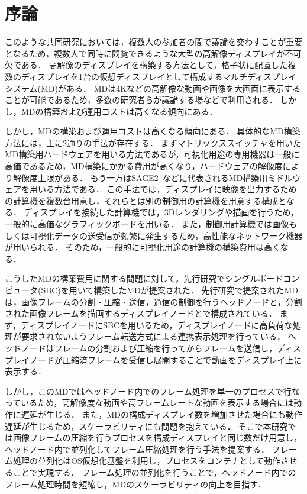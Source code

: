 \chapter{序論}

このような共同研究においては，複数人の参加者の間で議論を交わすことが重要となるため，複数人で同時に閲覧できるような大型の高解像ディスプレイが不可欠である．
高解像のディスプレイを構築する方法として，格子状に配置した複数のディスプレイを1台の仮想ディスプレイとして構成するマルチディスプレイシステム(MD)がある．
MDは4Kなどの高解像な動画や画像を大画面に表示することが可能であるため，多数の研究者らが議論する場などで利用される．
しかし，MDの構築および運用コストは高くなる傾向にある．

しかし，MDの構築および運用コストは高くなる傾向にある．
具体的なMD構築方法には，主に2通りの手法が存在する．
まずマトリックススイッチャを用いたMD構築用ハードウェアを用いる方法であるが，可視化用途の専用機器は一般に高価であるため，MD構築にかかる費用が高くなり，ハードウェアの解像度により解像度上限がある．
もう一方はSAGE2~\cite{sage2}などに代表されるMD構築用ミドルウェアを用いる方法である．
この手法では，ディスプレイに映像を出力するための計算機を複数台用意し，それらとは別の制御用の計算機を用意する構成となる．
ディスプレイを接続した計算機では，3Dレンダリングや描画を行うため，一般的に高価なグラフィックボードを用いる．
また，制御用計算機では画像もしくは可視化データの送受信が頻繁に発生するため，高性能なネットワーク機器が用いられる．
そのため，一般的に可視化用途の計算機の構築費用は高くなる．

こうしたMDの構築費用に関する問題に対して，先行研究でシングルボードコンピュータ(SBC)を用いて構築したMDが提案された．
先行研究で提案されたMDは，画像フレームの分割・圧縮・送信，通信の制御を行うヘッドノードと，分割された画像フレームを描画するディスプレイノードとで構成されている．
まず，ディスプレイノードにSBCを用いるため，ディスプレイノードに高負荷な処理が要求されないようフレーム転送方式による連携表示処理を行っている．
ヘッドノードはフレームの分割および圧縮を行ってからフレームを送信し，ディスプレイノードが圧縮済フレームを受信し展開することで動画をディスプレイ上に表示する．

しかし，このMDではヘッドノード内でのフレーム処理を単一のプロセスで行なっているため，高解像度な動画や高フレームレートな動画を表示する場合には動作に遅延が生じる．
また，MDの構成ディスプレイ数を増加させた場合にも動作遅延が生じるため，スケーラビリティにも問題を抱えている．
そこで本研究では画像フレームの圧縮を行うプロセスを構成ディスプレイと同じ数だけ用意し，ヘッドノード内で並列化してフレーム圧縮処理を行う手法を提案する．
フレーム処理の並列化はOS仮想化基盤を利用し，プロセスをコンテナとして動作させることで実現する．
フレーム処理の並列化を行うことで，ヘッドノード内でのフレーム処理時間を短縮し，MDのスケーラビリティの向上を目指す．

